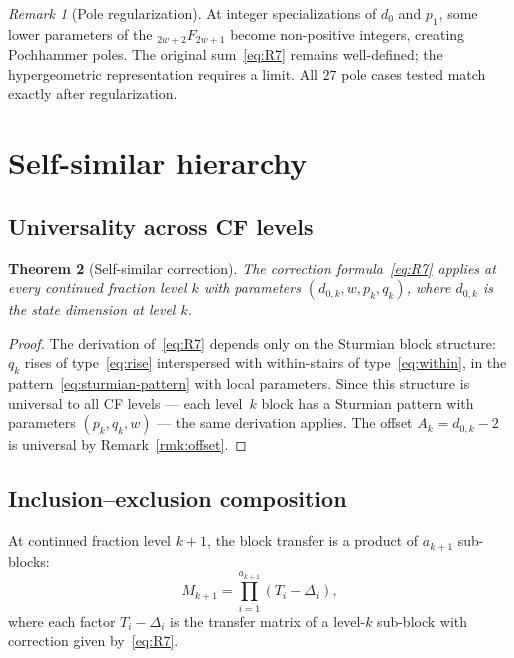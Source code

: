 \documentclass[11pt]{article}
\newtheorem{theorem}{Theorem}[section]
\theoremstyle{definition}
\theoremstyle{remark}
\newtheorem{remark}[theorem]{Remark}
\newcommand{\pFq}[2]{{}_{#1}F_{#2}}
\begin{document}
\begin{remark}[Pole regularization]
At integer specializations of $d_0$ and $p_1$, some lower
parameters of the $\pFq{2w+2}{2w+1}$ become non-positive integers,
creating Pochhammer poles.
The original sum~\eqref{eq:R7} remains well-defined; the
hypergeometric representation requires a limit.
All $27$ pole cases tested match exactly after regularization.
\end{remark}

\section{Self-similar hierarchy}\label{sec:selfsim}

\subsection{Universality across CF levels}

\begin{theorem}[Self-similar correction]\label{thm:selfsim}
The correction formula~\eqref{eq:R7} applies at every continued
fraction level $k$ with parameters $(d_{0,k}, w, p_k, q_k)$,
where $d_{0,k}$ is the state dimension at level $k$.
\end{theorem}

\begin{proof}
The derivation of~\eqref{eq:R7} depends only on the Sturmian block
structure: $q_k$ rises of type~\eqref{eq:rise} interspersed with
within-stairs of type~\eqref{eq:within}, in the
pattern~\eqref{eq:sturmian-pattern} with local parameters.
Since this structure is universal to all CF levels --- each
level~$k$ block has a Sturmian pattern with parameters
$(p_k, q_k, w)$ --- the same derivation applies.
The offset $A_k = d_{0,k} - 2$ is universal by
Remark~\ref{rmk:offset}.
\end{proof}

\subsection{Inclusion--exclusion composition}

At continued fraction level $k + 1$, the block transfer is a
product of $a_{k+1}$ sub-blocks:
\begin{equation}\label{eq:product}
  M_{k+1} = \prod_{i=1}^{a_{k+1}} (T_i - \Delta_i),
\end{equation}
where each factor $T_i - \Delta_i$ is the transfer matrix of a
level-$k$ sub-block with correction given
by~\eqref{eq:R7}.
\end{document}
